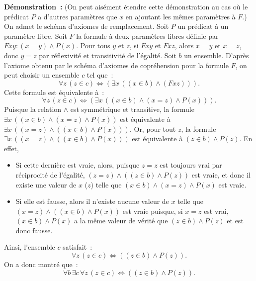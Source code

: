 \noindent\textbf{Démonstration :} 
    (On peut aisément étendre cette démonstration au cas où le prédicat $P$ a d'autres paramètres que $x$ en ajoutant les mêmes paramètres à $F$.)
    On admet le schéma d'axiomes de remplacement. 
    Soit $P$ un prédicat à un paramètre libre. 
    Soit $F$ la formule à deux paramètres libres définie par $F x y : (x = y) \wedge P(x)$. 
    Pour tous $y$ et $z$, si $F x y$ et $F x z$, alors $x = y$ et $x = z$, donc $y = z$ par réflexivité et transitivité de l'égalité.
    Soit $b$ un ensemble. 
    D'après l'axiome obtenu par le schéma d'axiomes de copréhension pour la formule $F$, on peut choisir un ensemble $c$ tel que : 
    \begin{equation*}
        \forall z \, (z \in c) \Leftrightarrow \left( \exists x \, ((x \in b) \wedge (F x z)) \right). 
    \end{equation*}
    Cette formule est équivalente à : 
    \begin{equation*}
        \forall z \, (z \in c) \Leftrightarrow \left( \exists x \, ((x \in b) \wedge (x = z) \wedge P(x)) \right). 
    \end{equation*}
    Puisque la relation $\wedge$ est symmétrique et transitive, la formule $\exists x \, ((x \in b) \wedge (x = z) \wedge P(x))$ est équivalente à $\exists x \, ((x = z) \wedge  ((x \in b) \wedge P(x)))$.
    Or, pour tout $z$, la formule $\exists x \, ((x = z) \wedge ((x \in b) \wedge P(x)))$ est équivalente à $(z \in b) \wedge P(z)$.
    En effet, 
    \begin{itemize}[nosep]
        \item Si cette dernière est vraie, alors, puisque $z = z$ est toujours vrai par réciprocité de l'égalité, $(z = z) \wedge ((z \in b) \wedge P(z))$ est vraie, et donc il existe une valeur de $x$ ($z$) telle que $(x \in b) \wedge (x = z) \wedge P(x)$ est vraie. 
        \item Si elle est fausse, alors il n'existe aucune valeur de $x$ telle que $(x = z) \wedge ((x \in b) \wedge P(x))$ est vraie puisque, si $x = z$ est vrai, $(x \in b) \wedge P(x)$ a la même valeur de vérité que $(z \in b) \wedge P(z)$ et est donc fausse.
    \end{itemize}
    Ainsi, l'ensemble $c$ satisfait : 
    \begin{equation*}
        \forall z \, (z \in c) \Leftrightarrow \left( (z \in b) \wedge P(z) \right). 
    \end{equation*}
    On a donc montré que :
    \begin{equation*}
        \forall b \, \exists c \, \forall z \, (z \in c) \Leftrightarrow \left( (z \in b) \wedge P(z) \right). 
    \end{equation*}

